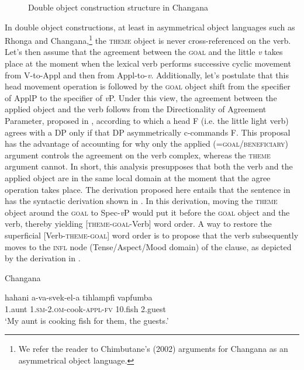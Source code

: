 \documentclass[output=paper]{langsci/langscibook}
\begin{document}
  
 

\begin{figure}
\caption{Double object construction structure in Changana}
\label{fig:3}
\end{figure}

In double object constructions, at least in {asymmetrical object languages such as Rhonga and Changana,}\footnote{ {We refer the reader to Chimbutane’s (2002) arguments for Changana as an asymmetrical object language.}} {}the \textsc{theme} object is never cross-referenced on the verb. Let’s then assume that the agreement between the \textsc{goal} and the little {\textit{v}} takes place at the moment when the lexical verb performs successive cyclic movement from V-to-Appl and then from Appl-to-{\textit{v}}. Additionally, let’s postulate that this head movement operation is followed by the \textsc{goal} object shift from the specifier of ApplP to the specifier of {\textit{v}}P. Under this view, the agreement between the applied object and the verb follows from the Directionality of Agreement Parameter, proposed in , according to which a head F (i.e. the little light verb) agrees with a DP only if that DP asymmetrically c-commands F. This proposal has the advantage of accounting for why only the applied (=\textsc{goal/beneficiary}) argument controls the agreement on the verb complex, whereas the \textsc{theme} argument cannot. In short, this analysis presupposes that both the verb and the applied object are in the same local domain at the moment that the agree operation takes place. The derivation proposed here entails that the sentence in  has the syntactic derivation shown in . In this derivation, moving the \textsc{theme} object around the \textsc{goal} to Spec-{\textit{v}}P would put it before the \textsc{goal} object and the verb, thereby yielding [\textsc{theme-goal}{}-Verb] word order. A way to restore the superficial [Verb-\textsc{theme-goal}] word order is to propose that the verb subsequently moves to the {\textsc{infl}} node (Tense/Aspect/Mood domain) of the clause, as depicted by the derivation in .

\ea
{Changana}

\gll hahani       a-va-svek-el-a                        tihlampfi      vapfumba\\
     1.aunt        1.{\textsc{sm}}{{}-2.}{\textsc{om}}{{}-}cook{{}-}{\textsc{appl}}{{}-}{\textsc{fv}}      {10.}fish          2.guest\\
\glt ‘My aunt is cooking fish for them, the guests.’
\z
\end{document}
